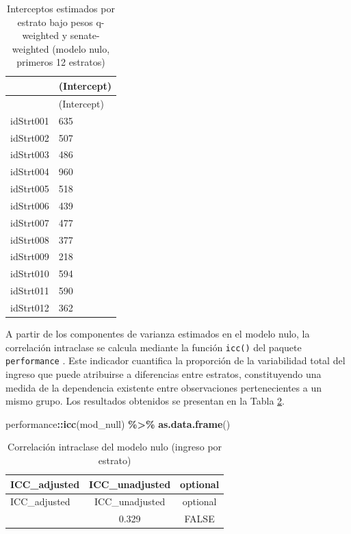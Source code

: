 \documentclass[
  spanish,
  12pt,
]{book}
\newenvironment{Shaded}{\begin{snugshade}}{\end{snugshade}}
\newcommand{\FunctionTok}[1]{\textcolor[rgb]{0.13,0.29,0.53}{\textbf{#1}}}
\newcommand{\NormalTok}[1]{#1}
\newcommand{\SpecialCharTok}[1]{\textcolor[rgb]{0.81,0.36,0.00}{\textbf{#1}}}
\begin{document}
\begin{longtable}[]{@{}ll@{}}
\caption{\label{tab:tab-interceptos-nulos}Interceptos estimados por estrato bajo pesos q-weighted y senate-weighted (modelo nulo, primeros 12 estratos)}\tabularnewline
\toprule\noalign{}
& (Intercept) \\
\midrule\noalign{}
\endfirsthead
\toprule\noalign{}
& (Intercept) \\
\midrule\noalign{}
\endhead
\bottomrule\noalign{}
\endlastfoot
idStrt001 & 635 \\
idStrt002 & 507 \\
idStrt003 & 486 \\
idStrt004 & 960 \\
idStrt005 & 518 \\
idStrt006 & 439 \\
idStrt007 & 477 \\
idStrt008 & 377 \\
idStrt009 & 218 \\
idStrt010 & 594 \\
idStrt011 & 590 \\
idStrt012 & 362 \\
\end{longtable}

A partir de los componentes de varianza estimados en el modelo nulo, la correlación intraclase se calcula mediante la función \texttt{icc()} del paquete \texttt{performance} \citep{performance2026}. Este indicador cuantifica la proporción de la variabilidad total del ingreso que puede atribuirse a diferencias entre estratos, constituyendo una medida de la dependencia existente entre observaciones pertenecientes a un mismo grupo. Los resultados obtenidos se presentan en la Tabla \ref{tab:tab-icc-nulo}.

\begin{Shaded}
\begin{Highlighting}[]
\NormalTok{performance}\SpecialCharTok{::}\FunctionTok{icc}\NormalTok{(mod\_null) }\SpecialCharTok{\%\textgreater{}\%}
  \FunctionTok{as.data.frame}\NormalTok{()}
\end{Highlighting}
\end{Shaded}

\begin{longtable}[]{@{}lcc@{}}
\caption{\label{tab:tab-icc-nulo}Correlación intraclase del modelo nulo (ingreso por estrato)}\tabularnewline
\toprule\noalign{}
ICC\_adjusted & ICC\_unadjusted & optional \\
\midrule\noalign{}
\endfirsthead
\toprule\noalign{}
ICC\_adjusted & ICC\_unadjusted & optional \\
\midrule\noalign{}
\endhead
\bottomrule\noalign{}
\endlastfoot
0.329 & 0.329 & FALSE \\
\end{longtable}
\end{document}
